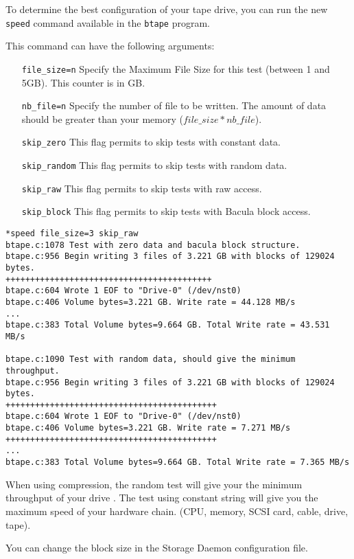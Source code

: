 To determine the best configuration of your tape drive, you can run the new
\texttt{speed} command available in the \texttt{btape} program.

This command can have the following arguments:
\begin{itemize}
\item[\texttt{file\_size=n}] Specify the Maximum File Size for this test
  (between 1 and 5GB). This counter is in GB.
\item[\texttt{nb\_file=n}] Specify the number of file to be written. The amount
  of data should be greater than your memory ($file\_size*nb\_file$).
\item[\texttt{skip\_zero}] This flag permits to skip tests with constant
  data.
\item[\texttt{skip\_random}] This flag permits to skip tests with random
  data.
\item[\texttt{skip\_raw}] This flag permits to skip tests with raw access.
\item[\texttt{skip\_block}] This flag permits to skip tests with Bacula block
  access.
\end{itemize}

\begin{verbatim}
*speed file_size=3 skip_raw
btape.c:1078 Test with zero data and bacula block structure.
btape.c:956 Begin writing 3 files of 3.221 GB with blocks of 129024 bytes.
++++++++++++++++++++++++++++++++++++++++++
btape.c:604 Wrote 1 EOF to "Drive-0" (/dev/nst0)
btape.c:406 Volume bytes=3.221 GB. Write rate = 44.128 MB/s
...
btape.c:383 Total Volume bytes=9.664 GB. Total Write rate = 43.531 MB/s

btape.c:1090 Test with random data, should give the minimum throughput.
btape.c:956 Begin writing 3 files of 3.221 GB with blocks of 129024 bytes.
+++++++++++++++++++++++++++++++++++++++++++
btape.c:604 Wrote 1 EOF to "Drive-0" (/dev/nst0)
btape.c:406 Volume bytes=3.221 GB. Write rate = 7.271 MB/s
+++++++++++++++++++++++++++++++++++++++++++
...
btape.c:383 Total Volume bytes=9.664 GB. Total Write rate = 7.365 MB/s

\end{verbatim}

When using compression, the random test will give your the minimum throughput
of your drive . The test using constant string will give you the maximum speed
of your hardware chain. (CPU, memory, SCSI card, cable, drive, tape).

You can change the block size in the Storage Daemon configuration file.

